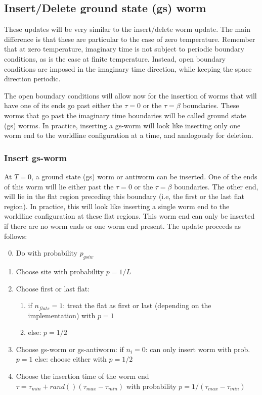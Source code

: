 \documentclass[12pt, two sided]{article}
\begin{document}
    \subsection{Insert/Delete ground state (gs) worm}
    These updates will be very similar to the insert/delete worm update. The main difference is that these are particular to the case of zero temperature. Remember that at zero temperature, imaginary time is not subject to periodic boundary conditions, as is the case at finite temperature. Instead, open boundary conditions are imposed in the imaginary time direction, while keeping the space direction periodic. 

    The open boundary conditions will allow now for the insertion of worms that will have one of its ends go past either the $\tau = 0$ or the $\tau = \beta$ boundaries. These worms that go past the imaginary time boundaries will be called ground state (gs) worms. In practice, inserting a gs-worm will look like inserting only one worm end to the worldline configuration at a time, and analogously for deletion. 

    \subsubsection{Insert gs-worm}

    At $T=0$, a ground state (gs) worm or antiworm can be inserted. One of the ends of this worm will lie either past the $\tau=0$ or the $\tau=\beta$ boundaries. The other end, will lie in the flat region preceding this boundary (i.e, the first or the last flat region). In practice, this will look like inserting a single worm end to the worldline configuration at these flat regions. This worm end can only be inserted if there are no worm ends or one worm end present. The update proceeds as
    follows:
    \begin{enumerate}
        \setcounter{enumi}{-1}
    \item Do with probability $p_{gsiw}$
    \item Choose site with probability $p=1/L$
    \item Choose first or last flat:
        \begin{enumerate}
            \item if $n_{flats} = 1$: treat the flat as first or last (depending on the implementation) with $p=1$
            \item else: $p=1/2$
        \end{enumerate}
    \item Choose gs-worm or gs-antiworm:
        if $n_i=0$: can only insert worm with prob. $p=1$ 
        else: choose either with $p=1/2$
    \item Choose the insertion time of the worm end $\tau = \tau_{min} + rand() (\tau_{max}-\tau_{min})$ with probability $p=1/(\tau_{max}-\tau_{min})$
    \end{enumerate}
\end{document}
